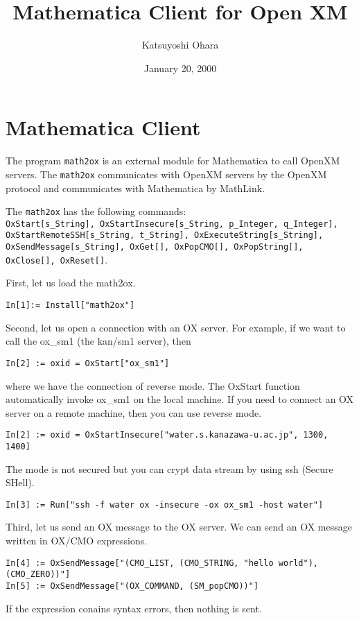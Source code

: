 \documentclass{article}
\title{Mathematica Client for Open XM}
\date{January 20, 2000}
\author{Katsuyoshi Ohara}
\begin{document}
\maketitle

\section{Mathematica Client}

The program {\tt math2ox} is an external module for Mathematica
to call OpenXM servers.
The {\tt math2ox} communicates with OpenXM servers by the OpenXM protocol
and communicates with Mathematica by MathLink.

The {\tt math2ox} has the following commands:\\
{\tt OxStart[s\_String], 
OxStartInsecure[s\_String, p\_Integer, q\_Integer],
OxStartRemoteSSH[s\_String, t\_String], 
OxExecuteString[s\_String], OxSendMessage[s\_String], OxGet[], OxPopCMO[],
OxPopString[], OxClose[], OxReset[]}.

First, let us load the math2ox.
\begin{verbatim}
In[1]:= Install["math2ox"]
\end{verbatim}

Second, let us open a connection with an OX server.
For example, if we want to call the ox\_sm1 (the kan/sm1 server), then
\begin{verbatim}
In[2] := oxid = OxStart["ox_sm1"]
\end{verbatim}
where we have the connection of reverse mode.  The OxStart function
automatically invoke ox\_sm1 on the local machine.  If you need to
connect an OX server on a remote machine, then you can use reverse mode.
\begin{verbatim}
In[2] := oxid = OxStartInsecure["water.s.kanazawa-u.ac.jp", 1300, 1400]
\end{verbatim}
The mode is not secured but you can crypt data stream by using ssh
(Secure SHell).
\begin{verbatim}
In[3] := Run["ssh -f water ox -insecure -ox ox_sm1 -host water"]
\end{verbatim}

Third, let us send an OX message to the OX server.
We can send an OX message written in OX/CMO expressions.
\begin{verbatim}
In[4] := OxSendMessage["(CMO_LIST, (CMO_STRING, "hello world"), (CMO_ZERO))"]
In[5] := OxSendMessage["(OX_COMMAND, (SM_popCMO))"]
\end{verbatim}
If the expression conains syntax errors, then nothing is sent.
\end{document}
